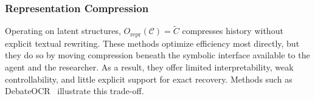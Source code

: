 
\subsubsection{Representation Compression} 
Operating on latent structures, \(O_{\mathrm{repr}}(\mathcal{C}) = \tilde{C}\) compresses history without explicit textual rewriting. These methods optimize efficiency most directly, but they do so by moving compression beneath the symbolic interface available to the agent and the researcher. As a result, they offer limited interpretability, weak controllability, and little explicit support for exact recovery. Methods such as DebateOCR~\citep{wu2026crossmodalmemorycompressionefficient} illustrate this trade-off.


